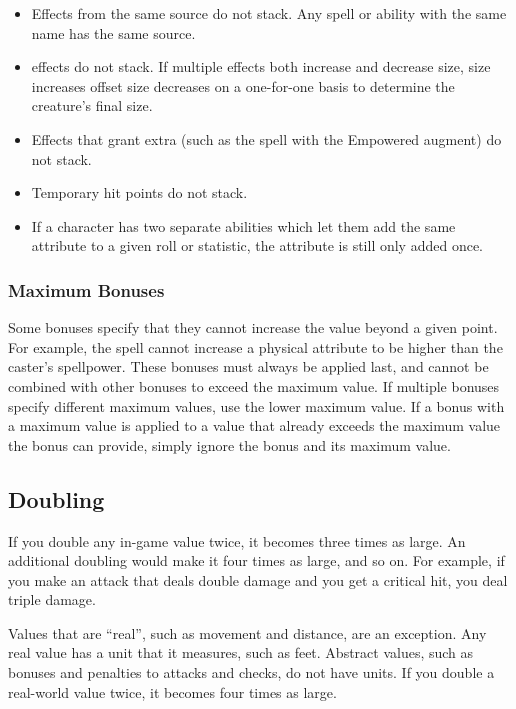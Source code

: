         \begin{itemize}
            \item Effects from the same source do not stack. Any spell or ability with the same name has the same source.
            \item {} effects do not stack.
                If multiple effects both increase and decrease size, size increases offset size decreases on a one-for-one basis to determine the creature's final size.
            \item Effects that grant extra  (such as the  spell with the Empowered augment) do not stack.
            \item Temporary hit points do not stack.
            \item If a character has two separate abilities which let them add the same attribute to a given roll or statistic, the attribute is still only added once.
        \end{itemize}

        \subsubsection{Maximum Bonuses}\label{Ability Limits}
            Some bonuses specify that they cannot increase the value beyond a given point.
            For example, the  spell cannot increase a physical attribute to be higher than the caster's spellpower.
            These bonuses must always be applied last, and cannot be combined with other bonuses to exceed the maximum value.
            If multiple bonuses specify different maximum values, use the lower maximum value.
            If a bonus with a maximum value is applied to a value that already exceeds the maximum value the bonus can provide, simply ignore the bonus and its maximum value.

    \subsection{Doubling}\label{Doubling}
        If you double any in-game value twice, it becomes three times as large. An additional doubling would make it four times as large, and so on. For example, if you make an attack that deals double damage and you get a critical hit, you deal triple damage.

         Values that are ``real'', such as movement and distance, are an exception.
        Any real value has a unit that it measures, such as feet.
        Abstract values, such as bonuses and penalties to attacks and checks, do not have units.
        If you double a real-world value twice, it becomes four times as large.

